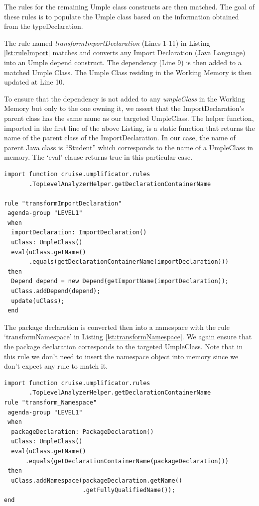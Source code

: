 The rules for the remaining Umple class constructs are then matched. The goal of these rules is to populate the Umple class based on the information obtained from the typeDeclaration. 

The rule named \textit{transformImportDeclaration} (Lines 1-11) in Listing \ref{lst:ruleImport} matches and converts any Import Declaration (Java Language) into an Umple depend construct. The dependency (Line 9) is then added to a matched Umple Class. The Umple Class residing in the Working Memory is then updated at Line 10.

To ensure that the dependency is not added to any \textit{umpleClass} in the Working Memory but only to the one owning it, we assert that the ImportDeclaration's parent class has the same name as our targeted UmpleClass. The helper function, imported in the first line of the above Listing, is a static function that returns the name of the parent class of the ImportDeclaration. In our case, the name of parent Java class is ``Student'' which corresponds to the name of a UmpleClass in memory. The `eval' clause returns true in this particular case.

\begin{lstlisting}[language={drools},label={lst:ruleImport}, caption=Rule transformImportDeclaration]
import function cruise.umplificator.rules
       .TopLevelAnalyzerHelper.getDeclarationContainerName
      
rule "transformImportDeclaration"
 agenda-group "LEVEL1" 
 when
  importDeclaration: ImportDeclaration()
  uClass: UmpleClass()
  eval(uClass.getName()
       .equals(getDeclarationContainerName(importDeclaration)))		
 then
  Depend depend = new Depend(getImportName(importDeclaration));
  uClass.addDepend(depend);
  update(uClass);
 end
\end{lstlisting}

The package declaration is converted then into a namespace with the rule `transformNamespace' in Listing \ref{lst:transformNamespace}. We again ensure that the package declaration corresponds to the targeted UmpleClass. Note that in this rule we don't need to insert the namespace object into memory since we don't expect any rule to match it.

\begin{lstlisting}[language={drools},label={lst:transformNamespace}, caption=Rule transformNamespace]
import function cruise.umplificator.rules
       .TopLevelAnalyzerHelper.getDeclarationContainerName
rule "transform_Namespace"
 agenda-group "LEVEL1" 
 when
  packageDeclaration: PackageDeclaration()
  uClass: UmpleClass()
  eval(uClass.getName()
      .equals(getDeclarationContainerName(packageDeclaration)))	
 then
  uClass.addNamespace(packageDeclaration.getName()
                      .getFullyQualifiedName());
end
\end{lstlisting}

